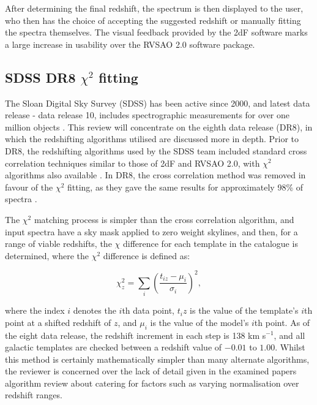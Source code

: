 \documentclass[titlesmallcaps, examinerscopy, copyrightpage]{uqthesis}
\begin{document}
After determining the final redshift, the spectrum is then displayed to the user, who then has the choice of accepting the suggested redshift or manually fitting the spectra themselves. The visual feedback provided by the 2dF software marks a large increase in usability over the RVSAO 2.0 software package.



\subsection{SDSS DR8 $\chi^2$ fitting}

The Sloan Digital Sky Survey (SDSS) has been active since 2000, and latest data release - data release 10, includes spectrographic measurements for over one million objects \cite{SDSSIII}. This review will concentrate on the eighth data release (DR8), in which the redshifting algorithms utilised are discussed more in depth. Prior to DR8, the redshifting algorithms used by the SDSS team included standard cross correlation techniques similar to those of 2dF and RVSAO 2.0, with $\chi^2$ algorithms also available \cite{sdss6}. In DR8, the cross correlation method was removed in favour of the $\chi^2$ fitting, as they gave the same results for approximately 98\% of spectra \cite{aihara2011eighth}.

The $\chi^2$ matching process is simpler than the cross correlation algorithm, and input spectra have a sky mask applied to zero weight skylines, and then, for a range of viable redshifts, the $\chi$ difference for each template in the catalogue is determined, where the $\chi^2$ difference is defined as:

\begin{equation}
\chi^2_z = \sum_i \left(\frac{t_{iz} - \mu_i}{\sigma_i} \right)^2,
\end{equation}

where the index $i$ denotes the $i$th data point, $t_iz$ is the value of the template's $i$th point at a shifted redshift of $z$, and $\mu_i$ is the value of the model's $i$th point. As of the eight data release, the redshift increment in each step is 138 km s$^{-1}$, and all galactic templates are checked between a redshift value of $-0.01$ to $1.00$. Whilst this method is certainly mathematically simpler than many alternate algorithms, the reviewer is concerned over the lack of detail given in the examined papers algorithm review about catering for factors such as varying normalisation over redshift ranges.
\end{document}
